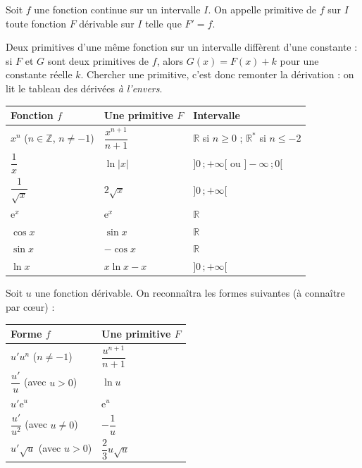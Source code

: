 \documentclass[11pt]{article}
\newcommand{\cle}[1]{{\popxbold\color{popdark}#1}}
\begin{document}
\begin{definition}
Soit $f$ une fonction continue sur un intervalle $I$. On appelle \cle{primitive} de $f$ sur $I$ toute fonction $F$ dérivable sur $I$ telle que $F' = f$.
\end{definition}

Deux primitives d'une même fonction sur un intervalle diffèrent d'une constante : si $F$ et $G$ sont deux primitives de $f$, alors $G(x) = F(x) + k$ pour une constante réelle $k$. Chercher une primitive, c'est donc \og remonter la dérivation \fg{} : on lit le tableau des dérivées \emph{à l'envers}.

\begin{aretenir}
\begin{center}
\begin{tabularx}{\linewidth}{|l|X|l|}
\hline
\rowcolor{popblueL} \textbf{Fonction $f$} & \textbf{Une primitive $F$} & \textbf{Intervalle} \\
\hline
$x^n$ ($n \in \mathbb{Z}$, $n \neq -1$) & $\dfrac{x^{n+1}}{n+1}$ & $\mathbb{R}$ si $n \geq 0$ ; $\mathbb{R}^*$ si $n \leq -2$ \\
\hline
$\dfrac{1}{x}$ & $\ln|x|$ & $]0\,;+\infty[$ ou $]-\infty\,;0[$ \\
\hline
$\dfrac{1}{\sqrt{x}}$ & $2\sqrt{x}$ & $]0\,;+\infty[$ \\
\hline
$\mathrm{e}^x$ & $\mathrm{e}^x$ & $\mathbb{R}$ \\
\hline
$\cos x$ & $\sin x$ & $\mathbb{R}$ \\
\hline
$\sin x$ & $-\cos x$ & $\mathbb{R}$ \\
\hline
$\ln x$ & $x\ln x - x$ & $]0\,;+\infty[$ \\
\hline
\end{tabularx}
\end{center}
\end{aretenir}

\begin{propriete}
Soit $u$ une fonction dérivable. On reconnaîtra les formes suivantes (à connaître par c\oe ur) :
\begin{center}
\begin{tabularx}{\linewidth}{|X|X|}
\hline
\rowcolor{popblueL} \textbf{Forme $f$} & \textbf{Une primitive $F$} \\
\hline
$u' u^n$ ($n \neq -1$) & $\dfrac{u^{n+1}}{n+1}$ \\
\hline
$\dfrac{u'}{u}$ (avec $u > 0$) & $\ln u$ \\
\hline
$u' \mathrm{e}^{u}$ & $\mathrm{e}^{u}$ \\
\hline
$\dfrac{u'}{u^2}$ (avec $u \neq 0$) & $-\dfrac{1}{u}$ \\
\hline
$u' \sqrt{u}$ (avec $u > 0$) & $\dfrac{2}{3}u\sqrt{u}$ \\
\hline
\end{tabularx}
\end{center}
\end{propriete}
\end{document}
